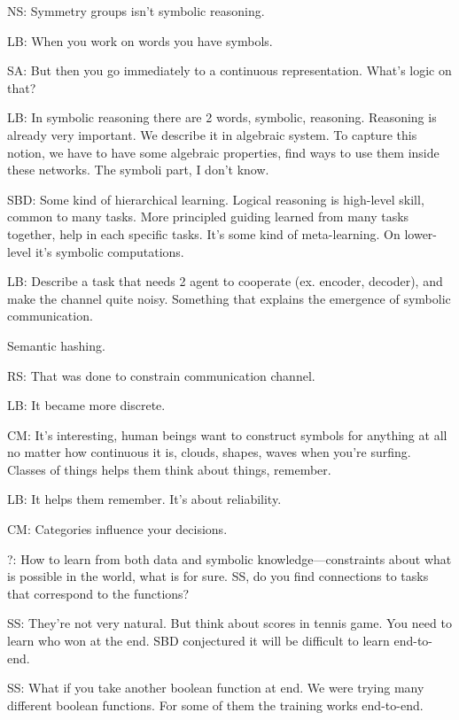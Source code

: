\begin{enumerate}
NS: Symmetry groups isn't symbolic reasoning.

LB: When you work on words you have symbols.

SA: But then you go immediately to a continuous representation. What's logic on that?

LB: In symbolic reasoning there are 2 words, symbolic, reasoning. Reasoning is already very important. We describe it in algebraic system. To capture this notion, we have to have some algebraic properties, find ways to use them inside these networks. The symboli part, I don't know.


SBD: Some kind of hierarchical learning. Logical reasoning is high-level skill, common to many tasks. More principled guiding learned from many tasks together, help in each specific tasks. It's some kind of meta-learning. On lower-level it's symbolic computations.

LB: Describe a task that needs 2 agent to cooperate (ex. encoder, decoder), and make the channel quite noisy. Something that explains the emergence of symbolic communication. 

Semantic hashing. 

RS: That was done to constrain communication channel.

LB: It became more discrete.

CM: It's interesting, human beings want to construct symbols for anything at all no matter how continuous it is, clouds, shapes, waves when you're surfing. Classes of things helps them think about things, remember. 

LB: It helps them remember. It's about reliability. %
 
CM: Categories influence your decisions.

?: How to learn from both data and symbolic knowledge---constraints about what is possible in the world, what is for sure. SS, do you find connections to tasks that correspond to the functions?

SS: They're not very natural. But think about scores in tennis game. You need to learn who won at the end. SBD conjectured it will be difficult  to learn end-to-end.

SS: %
What if you take another boolean function at end. We were trying many different boolean functions. For some of them the training works end-to-end.


\end{enumerate}
